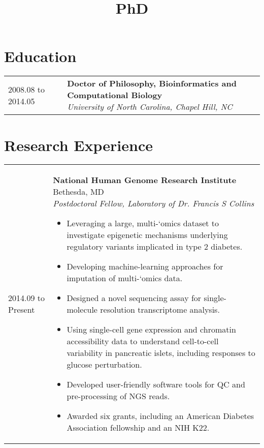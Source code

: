 \documentclass[11pt,letter,sans]{moderncv}
\title{PhD}
\makeatletter
\newenvironment{entrylistThree}{%
  \begin{tabular*}{\textwidth}{@{\extracolsep{\fill}}ll}
}{%
  \end{tabular*}
}
\newcommand{\entryThree}[3]{%
  #1&\parbox[t]{127mm}{%
    \textbf{#2}\\%
    \textit{#3}\vspace{\parsep}%
  }\\}
\newenvironment{entrylistFive}{%
  \begin{tabular*}{\textwidth}{@{\extracolsep{\fill}}ll}
}{%
  \end{tabular*}
}
\newcommand{\entryFive}[5]{%
  #1&\parbox[t]{127mm}{%
    \textbf{#2}%
    \hfill%
    {\footnotesize #3}\\%
	\emph{#4}\\%
    #5\vspace{\parsep}%
  }\\}
\makeatother
\begin{document}
\makecvtitle

\section{Education}
\begin{entrylistThree}
\entryThree
{2008.08 to 2014.05}
{Doctor of Philosophy, Bioinformatics and Computational Biology}
{University of North Carolina, Chapel Hill, NC}
\entryThree
{1996.09 to 2001.06}
{Bachelor of Science, Computer Science}
{Northwestern University, Evanston, IL}
\end{entrylistThree}


\section{Research Experience}
\begin{entrylistFive}
\entryFive
{2014.09 to Present}
{National Human Genome Research Institute}
{Bethesda, MD}
{Postdoctoral Fellow, Laboratory of Dr. Francis S Collins}
{\vspace{-5mm}
\begin{itemize}
\item {Leveraging a large, multi-`omics dataset to investigate epigenetic mechanisms underlying regulatory variants implicated in type 2 diabetes.}
\item {Developing machine-learning approaches for imputation of multi-`omics data.}
\item {Designed a novel sequencing assay for single-molecule resolution transcriptome analysis.}
\item {Using single-cell gene expression and chromatin accessibility data to understand cell-to-cell variability in pancreatic islets, including responses to glucose perturbation.}
\item {Developed user-friendly software tools for QC and pre-processing of NGS reads.}
\item {Awarded six grants, including an American Diabetes Association fellowship and an NIH K22.}
\end{itemize}
}
\entryFive
{2009.05 to 2014.08}
{University of North Carolina at Chapel Hill}
{Chapel Hill, NC}
{Research Assistant, Laboratory of Dr. Fernando Pardo-Manuel de Villena}
{\vspace{-5mm}
\begin{itemize}
\item {Characterized the genetic determinants of two meiotic drive systems in the mouse. First, conducted a GWAS of wild mice to identify genes associated with the accumulation of Robertsonian translocations. Second, mapped a novel meiotic drive locus, \textit{R2d2}, and multiple modifier loci responsible for extreme transmission distortion in interspecific crosses.}

\end{itemize}}
\end{entrylistFive}
\end{document}
